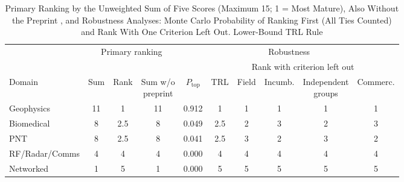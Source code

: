 \begin{table}[!t]
\renewcommand{\arraystretch}{1.3}
\setlength{\tabcolsep}{3pt}
\caption{Primary Ranking by the Unweighted Sum of Five Scores (Maximum 15; 1 = Most Mature), Also Without the Preprint \cite{r50_Muradoglu2025}, and Robustness Analyses: Monte Carlo Probability of Ranking First (All Ties Counted) and Rank With One Criterion Left Out. Lower-Bound TRL Rule}
\label{tab:loo}
\centering
\footnotesize
\begin{tabular}{|l|c|c|c|c|c|c|c|c|c|}
\hline
 & \multicolumn{3}{c|}{Primary ranking} & \multicolumn{6}{c|}{Robustness} \\
\cline{2-10}
 & & & & & \multicolumn{5}{c|}{Rank with criterion left out} \\
\cline{6-10}
Domain & Sum & Rank & \shortstack{Sum w/o\\preprint} & $P_{\mathrm{top}}$ & TRL & Field & Incumb. & \shortstack{Independent\\groups} & Commerc. \\
\hline
Geophysics & 11 & 1 & 11 & 0.912 & 1 & 1 & 1 & 1 & 1 \\
\hline
Biomedical & 8 & 2.5 & 8 & 0.049 & 2.5 & 2 & 3 & 2 & 3 \\
\hline
PNT & 8 & 2.5 & 8 & 0.041 & 2.5 & 3 & 2 & 3 & 2 \\
\hline
RF/Radar/Comms & 4 & 4 & 4 & 0.000 & 4 & 4 & 4 & 4 & 4 \\
\hline
Networked & 1 & 5 & 1 & 0.000 & 5 & 5 & 5 & 5 & 5 \\
\hline
\end{tabular}
\end{table}
